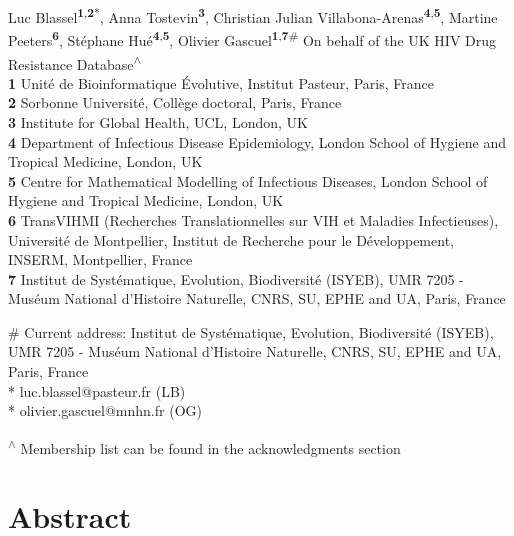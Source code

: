 \documentclass[
  11pt,
  twoside]{scrbook}
\begin{document}
Luc Blassel\textsuperscript{\textbf{1},\textbf{2}*}, Anna Tostevin\textsuperscript{\textbf{3}}, Christian Julian
Villabona-Arenas\textsuperscript{\textbf{4},\textbf{5}}, Martine Peeters\textsuperscript{\textbf{6}}, Stéphane Hué\textsuperscript{\textbf{4},\textbf{5}}, Olivier
Gascuel\textsuperscript{\textbf{1},\textbf{7}\#} On behalf of the UK HIV Drug Resistance
Database\textsuperscript{\(\wedge\)}\\

\textbf{1} Unité de Bioinformatique Évolutive, Institut Pasteur, Paris,
France\\
\textbf{2} Sorbonne Université, Collège doctoral, Paris, France\\
\textbf{3} Institute for Global Health, UCL, London, UK\\
\textbf{4} Department of Infectious Disease Epidemiology, London School of
Hygiene and Tropical Medicine, London, UK\\
\textbf{5} Centre for Mathematical Modelling of Infectious Diseases, London
School of Hygiene and Tropical Medicine, London, UK\\
\textbf{6} TransVIHMI (Recherches Translationnelles sur VIH et Maladies
Infectieuses), Université de Montpellier, Institut de Recherche pour le
Développement, INSERM, Montpellier, France\\
\textbf{7} Institut de Systématique, Evolution, Biodiversité (ISYEB), UMR
7205 - Muséum National d'Histoire Naturelle, CNRS, SU, EPHE and UA,
Paris, France

\# Current address: Institut de Systématique, Evolution, Biodiversité
(ISYEB), UMR 7205 - Muséum National d'Histoire Naturelle, CNRS, SU, EPHE
and UA, Paris, France\\
* luc.blassel@pasteur.fr (LB)\\
* olivier.gascuel@mnhn.fr (OG)

\textsuperscript{\(\wedge\)} Membership list can be found in the acknowledgments section

\hypertarget{abstract-paper}{%
\section*{Abstract}\label{abstract-paper}}
\end{document}
